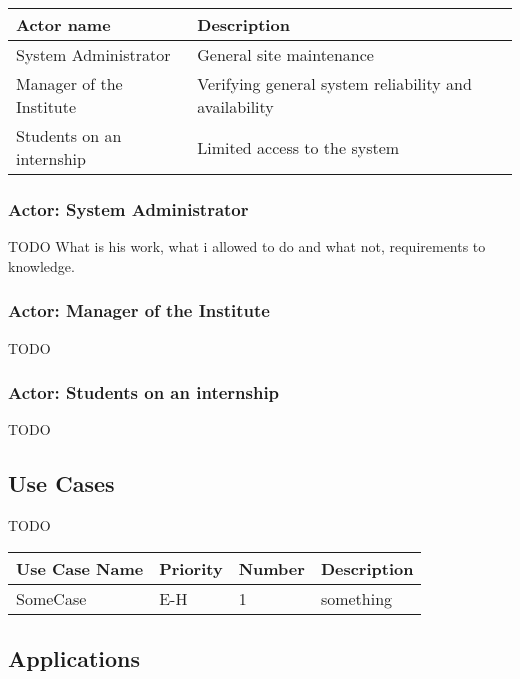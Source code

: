 \documentclass[12pt]{article}
\begin{document}
\begin{table}[!h]
	\begin{tabular}{| l | l |}
		\hline
		\textbf{Actor name}		& \textbf{Description}\\
		\hline
		System Administrator	& General site maintenance\\
		\hline
		Manager of the Institute	& Verifying general system reliability and availability\\
		\hline
		Students on an internship	& Limited access to the system\\
		\hline
	\end{tabular}
	\label{tab:Actors}
\end{table}

\subsubsection{Actor: System Administrator}
TODO What is his work, what i allowed to do and what not, requirements to knowledge.

\subsubsection{Actor: Manager of the Institute}
TODO

\subsubsection{Actor: Students on an internship}
TODO


\subsection{Use Cases}

TODO

\begin{table}[!h]
	\begin{tabular}{| l | l | l | l |}
		\hline
		\textbf{Use Case Name} & \textbf{Priority} & \textbf{Number} & \textbf{Description}\\
		\hline
		SomeCase	& E-H & 1 & something\\
		\hline
	\end{tabular}
	\label{tab:UseCases}
\end{table}

\subsection{Applications}
\end{document}
